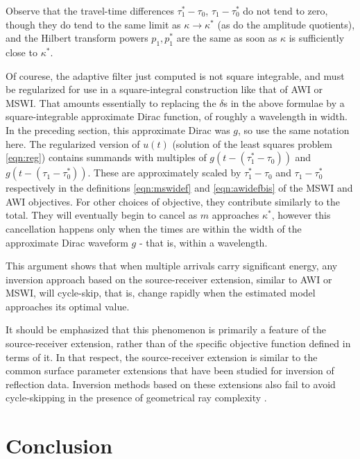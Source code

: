 Observe that the travel-time differences $\tau^*_1-\tau_0$,
$\tau_1-\tau_0^*$ do not tend to zero, though they do tend to the same
limit as $\kappa \rightarrow \kappa^*$ (as do the amplitude quotients), and the
Hilbert transform powers $p_1, p_1^*$ are the same as soon as $\kappa$ is
sufficiently close to $\kappa^*$.

Of courese, the adaptive filter just computed is not square
integrable, and must be regularized for use in a square-integral
construction like that of AWI or MSWI. That amounts essentially to
replacing the $\delta$s in the above formulae by a square-integrable
approximate Dirac function, of roughly a wavelength in width. In the
preceding section, this approximate Dirac was $g$, so use the same
notation here. The regularized version of $u(t)$ (solution of the
least squares problem \ref{eqn:reg}) contains summands with multiples of $g(t-(\tau^*_1-\tau_0))$
and $g(t-(\tau_1-\tau^*_0))$. These are approximately scaled by
$\tau^*_1-\tau_0$ and $\tau_1-\tau^*_0$ respectively in the
definitions \ref{eqn:mswidef} and \ref{eqn:awidefbis} of the MSWI and AWI
objectives. For other choices of objective, they contribute similarly
to the total. They will eventually begin to cancel as $m$ approaches
$\kappa^*$, however this cancellation happens only when the times are
within the width of the approximate 
Dirac waveform $g$ - that is, within a wavelength.

This argument shows that when multiple arrivals carry significant energy, any
inversion approach based on the source-receiver extension, similar to
AWI or MSWI, will cycle-skip, that is, change rapidly when the
estimated model approaches its optimal value.

It should be emphasized that this phenomenon is primarily a feature of the
source-receiver extension, rather than of the specific objective
function defined in terms of it. In that respect, the source-receiver
extension is similar to the common surface parameter extensions that
have been studied for inversion of reflection data. Inversion methods
based on these extensions also fail to avoid cycle-skipping in the presence of
geometrical ray complexity \cite[]{geoprosp:2008}.

\section{Conclusion}

